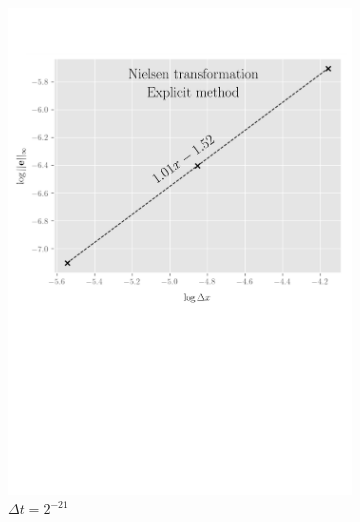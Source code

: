 \begin{figure}[tbp]
  \centering
  \begin{subfigure}{0.4\textwidth}
    \centering
    \includegraphics[width=\textwidth]{chapters/chapter3/ConvergenceSpaceExplicitNielsen.pdf}
    \caption{$\Delta{x}=2^{-7},\dots,2^{-10}$}
    \caption*{$\Delta{t}=2^{-21}$}
    \label{fig:finitedifferencesschemes:numericaresults:nielsen_explicit_space}
  \end{subfigure}
  \hspace{0.5cm}
  \begin{subfigure}{0.4\textwidth}
    \centering

\end{subfigure}
\end{figure}
